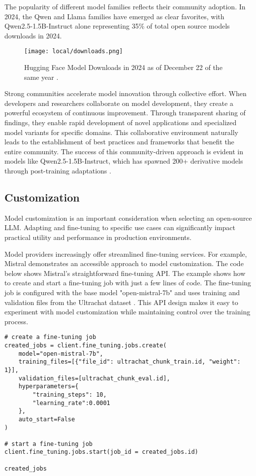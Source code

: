 The popularity of different model families reflects their community adoption. In 2024, the Qwen and Llama families have emerged as clear favorites, with Qwen2.5-1.5B-Instruct alone representing 35\% of total open source models downloads in 2024.

\begin{figure}[H]
\centering
\texttt{[image: local/downloads.png]}
\caption{Hugging Face Model Downloads in 2024 as of December 22 of the same year \cite{hf2024yearinreview}.}
\label{fig:downloads}
\end{figure}

Strong communities accelerate model innovation through collective effort. When developers and researchers collaborate on model development, they create a powerful ecosystem of continuous improvement. Through transparent sharing of findings, they enable rapid development of novel applications and specialized model variants for specific domains. This collaborative environment naturally leads to the establishment of best practices and frameworks that benefit the entire community. The success of this community-driven approach is evident in models like Qwen2.5-1.5B-Instruct, which has spawned 200+ derivative models through post-training adaptations .

\subsection{Customization}

Model customization is an important consideration when selecting an open-source LLM. Adapting and fine-tuning to specific use cases can significantly impact practical utility and performance in production environments.

Model providers increasingly offer streamlined fine-tuning services. For example, Mistral demonstrates an accessible approach to model customization.
The code below shows Mistral's straightforward fine-tuning API. The example shows how to create and start a fine-tuning job with just a few lines of code. The fine-tuning job is configured with the base model "open-mistral-7b" and uses training and validation files from the Ultrachat dataset . This API design makes it easy to experiment with model customization while maintaining control over the training process.

\begin{verbatim}
# create a fine-tuning job
created_jobs = client.fine_tuning.jobs.create(
    model="open-mistral-7b", 
    training_files=[{"file_id": ultrachat_chunk_train.id, "weight": 1}],
    validation_files=[ultrachat_chunk_eval.id], 
    hyperparameters={
        "training_steps": 10,
        "learning_rate":0.0001
    },
    auto_start=False
)

# start a fine-tuning job
client.fine_tuning.jobs.start(job_id = created_jobs.id)

created_jobs
\end{verbatim}

